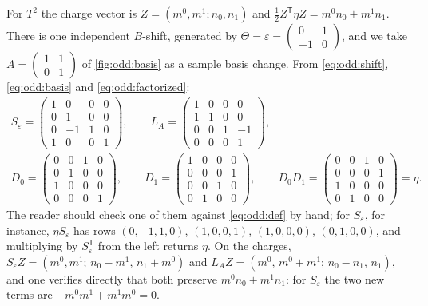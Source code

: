 For $T^2$ the charge vector is $Z=(m^0,m^1;n_0,n_1)$ and
$\frac12Z^{\mathsf T}\eta Z=m^0n_0+m^1n_1$. There is one independent $B$-shift, generated by
$\Theta=\varepsilon=\left(\begin{smallmatrix}0&1\\-1&0\end{smallmatrix}\right)$, and we
take $A=\left(\begin{smallmatrix}1&1\\0&1\end{smallmatrix}\right)$ of
\cref{fig:odd:basis} as a sample basis change. From \eqref{eq:odd:shift},
\eqref{eq:odd:basis} and \eqref{eq:odd:factorized}:
\begin{equation}\label{eq:odd:4x4}
\begin{gathered}
 S_\varepsilon=\begin{pmatrix}1&0&0&0\\0&1&0&0\\0&-1&1&0\\1&0&0&1\end{pmatrix},\qquad
 L_A=\begin{pmatrix}1&0&0&0\\1&1&0&0\\0&0&1&-1\\0&0&0&1\end{pmatrix},\\[2mm]
 D_0=\begin{pmatrix}0&0&1&0\\0&1&0&0\\1&0&0&0\\0&0&0&1\end{pmatrix},\qquad
 D_1=\begin{pmatrix}1&0&0&0\\0&0&0&1\\0&0&1&0\\0&1&0&0\end{pmatrix},\qquad
 D_0D_1=\begin{pmatrix}0&0&1&0\\0&0&0&1\\1&0&0&0\\0&1&0&0\end{pmatrix}=\eta .
\end{gathered}
\end{equation}
The reader should check one of them against \eqref{eq:odd:def} by hand; for $S_\varepsilon$,
for instance, $\eta S_\varepsilon$ has rows $(0,-1,1,0)$, $(1,0,0,1)$, $(1,0,0,0)$,
$(0,1,0,0)$, and multiplying by $S_\varepsilon^{\mathsf T}$ from the left returns $\eta$.
On the charges,
$S_\varepsilon Z=(m^0,m^1;\,n_0-m^1,\,n_1+m^0)$ and
$L_AZ=(m^0,\,m^0+m^1;\,n_0-n_1,\,n_1)$, and one verifies directly that both preserve
$m^0n_0+m^1n_1$: for $S_\varepsilon$ the two new terms are $-m^0m^1+m^1m^0=0$.

